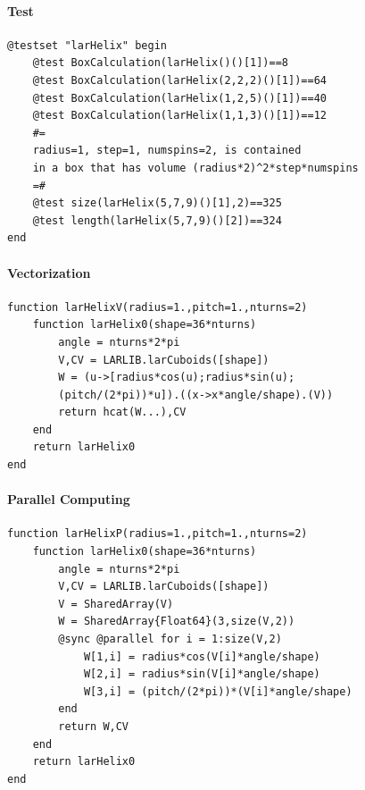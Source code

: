 \documentclass{article}
\begin{document}
\paragraph{Test}

\begin{Verbatim}
@testset "larHelix" begin
	@test BoxCalculation(larHelix()()[1])==8
	@test BoxCalculation(larHelix(2,2,2)()[1])==64
	@test BoxCalculation(larHelix(1,2,5)()[1])==40
	@test BoxCalculation(larHelix(1,1,3)()[1])==12
	#=
	radius=1, step=1, numspins=2, is contained
	in a box that has volume (radius*2)^2*step*numspins
	=#
	@test size(larHelix(5,7,9)()[1],2)==325
	@test length(larHelix(5,7,9)()[2])==324
end
\end{Verbatim}

\paragraph{Vectorization}

\begin{verbatim}
function larHelixV(radius=1.,pitch=1.,nturns=2)
    function larHelix0(shape=36*nturns)
        angle = nturns*2*pi
        V,CV = LARLIB.larCuboids([shape])
        W = (u->[radius*cos(u);radius*sin(u);
        (pitch/(2*pi))*u]).((x->x*angle/shape).(V))
        return hcat(W...),CV
    end
    return larHelix0
end 
\end{verbatim}

\paragraph{Parallel Computing} 

\begin{Verbatim}
function larHelixP(radius=1.,pitch=1.,nturns=2)
    function larHelix0(shape=36*nturns)
        angle = nturns*2*pi
        V,CV = LARLIB.larCuboids([shape])
        V = SharedArray(V)
        W = SharedArray{Float64}(3,size(V,2))
        @sync @parallel for i = 1:size(V,2)
            W[1,i] = radius*cos(V[i]*angle/shape)  
            W[2,i] = radius*sin(V[i]*angle/shape)
            W[3,i] = (pitch/(2*pi))*(V[i]*angle/shape)
        end
        return W,CV
    end
    return larHelix0
end
\end{Verbatim}
\end{document}
